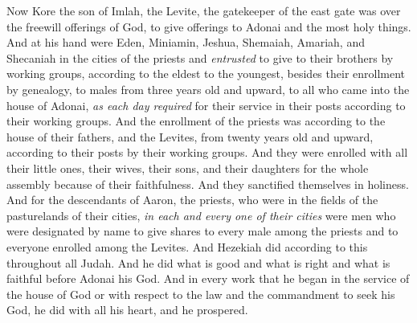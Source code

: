 \begin{biblechapter}
\verse Now Kore the son of Imlah, the Levite, the gatekeeper of the east gate was over the freewill offerings of God, to give offerings to Adonai and the most holy things.
\verse And at his hand were Eden, Miniamin, Jeshua, Shemaiah, Amariah, and Shecaniah in the cities of the priests and \textit{entrusted} to give to their brothers by working groups, according to the eldest to the youngest,
\verse besides their enrollment by genealogy, to males from three years old and upward, to all who came into the house of Adonai, \textit{as each day required} for their service in their posts according to their working groups.
\verse And the enrollment of the priests was according to the house of their fathers, and the Levites, from twenty years old and upward, according to their posts by their working groups.
\verse And they were enrolled with all their little ones, their wives, their sons, and their daughters for the whole assembly because of their faithfulness. And they sanctified themselves in holiness.
\verse And for the descendants of Aaron, the priests, who were in the fields of the pasturelands of their cities, \textit{in each and every one of their cities} were men who were designated by name to give shares to every male among the priests and to everyone enrolled among the Levites.
\verse And Hezekiah did according to this throughout all Judah. And he did what is good and what is right and what is faithful before Adonai his God.
\verse And in every work that he began in the service of the house of God or with respect to the law and the commandment to seek his God, he did with all his heart, and he prospered.
\end{biblechapter}

